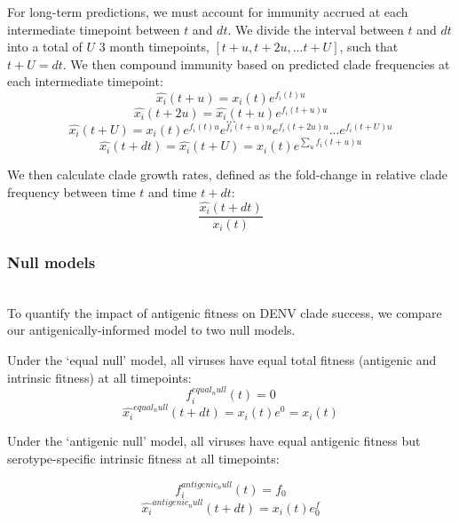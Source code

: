\documentclass[11pt,oneside,letterpaper]{article}
\begin{document}
For long-term predictions, we must account for immunity accrued at each intermediate timepoint between $t$ and $dt$.
We divide the interval between $t$ and $dt$ into a total of $U$ 3 month timepoints, $[t+u, t+2u, ... t+U]$, such that $t+U=dt$.
We then compound immunity based on predicted clade frequencies at each intermediate timepoint:
\begin{equation}
\hat{x_i}(t+u) = x_i(t)e^{f_i(t) u}
\end{equation}
\begin{equation}
\hat{x_i}(t+2u) = \hat{x_i}(t+u) e^{f_i(t+u)u}
\end{equation}
$$...$$
\begin{equation}
\hat{x_i}(t+U) = x_i(t) e^{f_i(t)u} e^{f_i(t+u)u} e^{f_i(t+2u)u} ... e^{f_i(t+U)u}
\end{equation}
\begin{equation}
  \label{eq_compounding_immunity}
\hat{x_i}(t+dt) = \hat{x_i}(t+U) = x_i(t) e^{\sum_{u}f_i(t+u)u}
\end{equation}

We then calculate clade growth rates, defined as the fold-change in relative clade frequency between time $t$ and time $t+dt$:
\begin{equation}
  \label{eq_growth_rate}
\frac{\hat{x_i}(t+dt)}{x_i(t)}
\end{equation}

\subsubsection{Null models}\\
To quantify the impact of antigenic fitness on DENV clade success, we compare our antigenically-informed model to two null models.

Under the `equal null' model, all viruses have equal total fitness (antigenic and intrinsic fitness) at all timepoints:
\begin{equation}
  \label{equal_null}
f_i^{equal_null}(t) = 0
\end{equation}
\begin{equation}
\hat{x_i}^{equal_null}(t+dt) = x_i(t) e^0 = x_i(t)
\end{equation}

Under the `antigenic null' model, all viruses have equal antigenic fitness but serotype-specific intrinsic fitness at all timepoints:

\begin{equation}
  \label{antigenic_null}
  f_i^{antigenic_null}(t) = f_0
\end{equation}
\begin{equation}
\hat{x_i}^{antigenic_null}(t+dt) = x_i(t) e^f_0
\end{equation}
\end{document}
